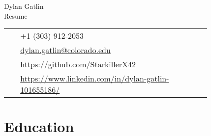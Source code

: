 \documentclass[10pt]{article} %
\begin{document}
\begin{paracol}{2} %

\parbox[top][0.08\textheight][c]{\linewidth}{ %
    \vspace{-0.04\textheight} %
    \centering %
    {\sffamily\Huge Dylan Gatlin}\\\medskip %
    {\Huge\color{headings}\cvtextfont Resume}
}

\switchcolumn
\parbox[top][0.08\textheight][c]{\linewidth}{
    \vspace{-0.04\textheight}
    \colorbox{shade}{ %
        \begin{supertabular}{p{0.05\linewidth}|p{0.775\linewidth}}
            \raisebox{-1pt}{\faPhone} & +1 (303) 912-2053 \\
            \raisebox{0pt}{\small\faEnvelope} &
             \href{mailto:dylan.gatlin@colorado.edu}
             {dylan.gatlin@colorado.edu} \\
            \raisebox{-1pt}{\faGithub} &
             \href{https://github.com/StarkillerX42}
             {https://github.com/StarkillerX42} \\
            \raisebox{-1pt}{\faLinkedinSquare} & 
            \href{https://www.linkedin.com/in/dylan-gatlin-101655186/}
            {https://www.linkedin.com/in/dylan-gatlin-101655186/} \\
        \end{supertabular}
    }
}
\switchcolumn


\medskip
\section{Education} 


\end{paracol}
\end{document}
